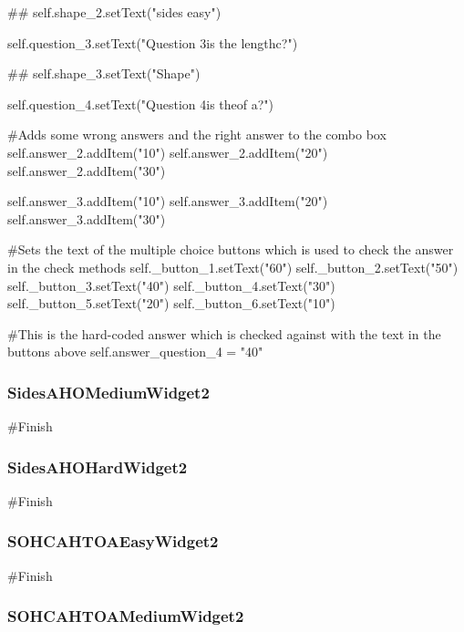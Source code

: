 \begin{landscape}
\begin{python}
##        self.shape_2.setText("sides easy")
        
        self.question_3.setText("Question 3\nWhat is the length\nof c?")
        
##        self.shape_3.setText("Shape")
        
        self.question_4.setText("Question 4\nWhat is the\nlength of a?")

        #Adds some wrong answers and the right answer to the combo box
        self.answer_2.addItem("10")
        self.answer_2.addItem("20")
        self.answer_2.addItem("30")

        self.answer_3.addItem("10")
        self.answer_3.addItem("20")
        self.answer_3.addItem("30")

        #Sets the text of the multiple choice buttons which is used to check the answer in the check methods
        self._button_1.setText("60")
        self._button_2.setText("50")
        self._button_3.setText("40")
        self._button_4.setText("30")
        self._button_5.setText("20")
        self._button_6.setText("10")

        #This is the hard-coded answer which is checked against with the text in the buttons above
        self.answer_question_4 = "40"
\end{python}

\subsubsection{SidesAHOMediumWidget2}

\begin{python}
#Finish
\end{python}

\subsubsection{SidesAHOHardWidget2}

\begin{python}
#Finish
\end{python}

\subsubsection{SOHCAHTOAEasyWidget2}

\begin{python}
#Finish
\end{python}

\subsubsection{SOHCAHTOAMediumWidget2}


\end{landscape}
